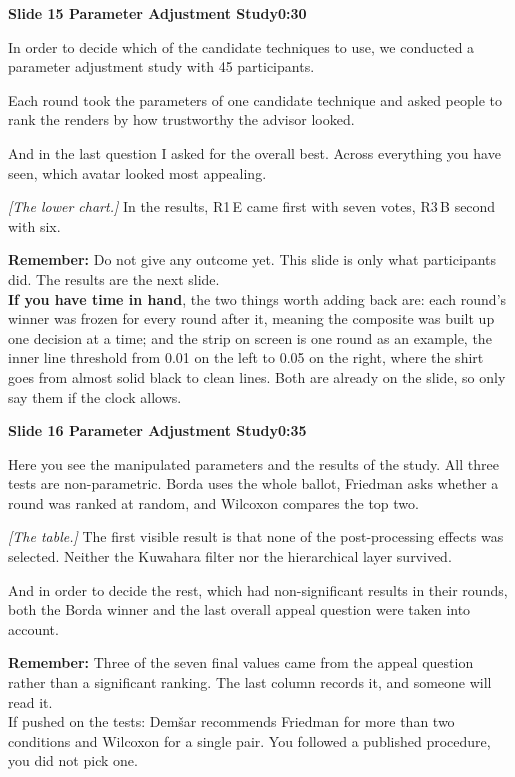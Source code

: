 \documentclass[11pt,a4paper]{article}
\newcommand{\slidehead}[3]{%
  \needspace{5\baselineskip}
  \vspace{0.9em}
  \noindent\colorbox{knblue}{\parbox{0.978\textwidth}{\vspace{1pt}\color{white}\textbf{Slide #1 \quad #2}\hfill\textbf{#3}\vspace{1pt}}}
  \vspace{0.35em}\par}
\newcommand{\remind}[1]{%
  \vspace{0.15em}
  \noindent\colorbox{knlight}{\parbox{0.972\textwidth}{\small\color{knblue}\textbf{Remember:} #1}}
  \vspace{0.2em}\par}
\newcommand{\pointto}[1]{{\color{knaccent}\textit{[#1]}}}
\begin{document}
\slidehead{15}{Parameter Adjustment Study}{0:30}

In order to decide which of the candidate techniques to use, we conducted a parameter adjustment study with 45 participants.

Each round took the parameters of one candidate technique and asked people to rank the renders by how trustworthy the advisor looked.

And in the last question I asked for the overall best. Across everything you have seen, which avatar looked most appealing.

\pointto{The lower chart.} In the results, R1\,E came first with seven votes, R3\,B second with six.

\remind{Do not give any outcome yet. This slide is only what participants did. The results are the next slide.\\[0.4em] \textbf{If you have time in hand}, the two things worth adding back are: each round's winner was frozen for every round after it, meaning the composite was built up one decision at a time; and the strip on screen is one round as an example, the inner line threshold from 0.01 on the left to 0.05 on the right, where the shirt goes from almost solid black to clean lines. Both are already on the slide, so only say them if the clock allows.}

\slidehead{16}{Parameter Adjustment Study}{0:35}

Here you see the manipulated parameters and the results of the study. All three tests are non-parametric. Borda uses the whole ballot, Friedman asks whether a round was ranked at random, and Wilcoxon compares the top two.

\pointto{The table.} The first visible result is that none of the post-processing effects was selected. Neither the Kuwahara filter nor the hierarchical layer survived.

And in order to decide the rest, which had non-significant results in their rounds, both the Borda winner and the last overall appeal question were taken into account.

\remind{Three of the seven final values came from the appeal question rather than a significant ranking. The last column records it, and someone will read it.\\[0.4em] If pushed on the tests: Dem\v{s}ar recommends Friedman for more than two conditions and Wilcoxon for a single pair. You followed a published procedure, you did not pick one.}

\end{document}
